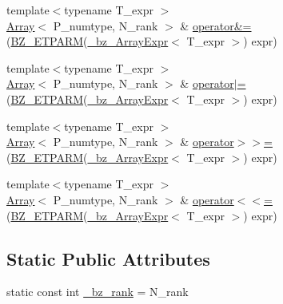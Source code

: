\begin{DoxyCompactItemize}
\item 
{\footnotesize template$<$typename T\+\_\+expr $>$ }\\\hyperlink{classArray}{Array}$<$ P\+\_\+numtype, N\+\_\+rank $>$ \& \hyperlink{classArray_a542861b563896b74d3fb1aee01bc6278}{operator\&=} (\hyperlink{tuning_8h_a92a6f3aa8f4cd5ac9b4239c449892bb7}{B\+Z\+\_\+\+E\+T\+P\+A\+R\+M}(\hyperlink{class__bz__ArrayExpr}{\+\_\+bz\+\_\+\+Array\+Expr}$<$ T\+\_\+expr $>$) expr)
\item 
{\footnotesize template$<$typename T\+\_\+expr $>$ }\\\hyperlink{classArray}{Array}$<$ P\+\_\+numtype, N\+\_\+rank $>$ \& \hyperlink{classArray_a8042d7e4f90af7b46edf3a3316345b5f}{operator$\vert$=} (\hyperlink{tuning_8h_a92a6f3aa8f4cd5ac9b4239c449892bb7}{B\+Z\+\_\+\+E\+T\+P\+A\+R\+M}(\hyperlink{class__bz__ArrayExpr}{\+\_\+bz\+\_\+\+Array\+Expr}$<$ T\+\_\+expr $>$) expr)
\item 
{\footnotesize template$<$typename T\+\_\+expr $>$ }\\\hyperlink{classArray}{Array}$<$ P\+\_\+numtype, N\+\_\+rank $>$ \& \hyperlink{classArray_a92bc0461988dfb9faee67d62863bcfed}{operator$>$$>$=} (\hyperlink{tuning_8h_a92a6f3aa8f4cd5ac9b4239c449892bb7}{B\+Z\+\_\+\+E\+T\+P\+A\+R\+M}(\hyperlink{class__bz__ArrayExpr}{\+\_\+bz\+\_\+\+Array\+Expr}$<$ T\+\_\+expr $>$) expr)
\item 
{\footnotesize template$<$typename T\+\_\+expr $>$ }\\\hyperlink{classArray}{Array}$<$ P\+\_\+numtype, N\+\_\+rank $>$ \& \hyperlink{classArray_aa2546e62d39e33b43bb93cc540c3338c}{operator$<$$<$=} (\hyperlink{tuning_8h_a92a6f3aa8f4cd5ac9b4239c449892bb7}{B\+Z\+\_\+\+E\+T\+P\+A\+R\+M}(\hyperlink{class__bz__ArrayExpr}{\+\_\+bz\+\_\+\+Array\+Expr}$<$ T\+\_\+expr $>$) expr)
\end{DoxyCompactItemize}
\subsection*{Static Public Attributes}
\begin{DoxyCompactItemize}
\item 
static const int \hyperlink{classArray_a0740c98d4e4ef7fb30e689b477c96ca0}{\+\_\+bz\+\_\+rank} = N\+\_\+rank
\end{DoxyCompactItemize}
